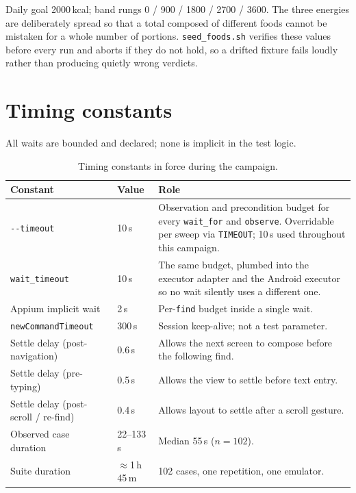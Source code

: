 \documentclass[11pt,a4paper]{article}
\begin{document}
Daily goal 2000\,kcal; band rungs 0 / 900 / 1800 / 2700 / 3600. The three energies
are deliberately spread so that a total composed of different foods cannot be
mistaken for a whole number of portions. \texttt{seed\_foods.sh} verifies these
values before every run and aborts if they do not hold, so a drifted fixture fails
loudly rather than producing quietly wrong verdicts.

\section{Timing constants}

All waits are bounded and declared; none is implicit in the test logic.

\begin{table}[h]
\centering\footnotesize
\caption{Timing constants in force during the campaign.}
\label{tab:timing}
\begin{tabular}{@{}llp{7.8cm}@{}}
\toprule
\textbf{Constant} & \textbf{Value} & \textbf{Role} \\
\midrule
\texttt{-{}-timeout} & 10\,s & Observation and precondition budget for every
\texttt{wait\_for} and \texttt{observe}. Overridable per sweep via
\texttt{TIMEOUT}; 10\,s used throughout this campaign. \\
\texttt{wait\_timeout} & 10\,s & The same budget, plumbed into the executor
adapter and the Android executor so no wait silently uses a different one. \\
Appium implicit wait & 2\,s & Per-\texttt{find} budget inside a single wait. \\
\texttt{newCommandTimeout} & 300\,s & Session keep-alive; not a test parameter. \\
Settle delay (post-navigation) & 0.6\,s & Allows the next screen to compose before
the following find. \\
Settle delay (pre-typing) & 0.5\,s & Allows the view to settle before text entry. \\
Settle delay (post-scroll / re-find) & 0.4\,s & Allows layout to settle after a
scroll gesture. \\
\midrule
Observed case duration & 22--133\,s & Median 55\,s ($n=102$). \\
Suite duration & $\approx$1\,h\,45\,m & 102 cases, one repetition, one emulator. \\
\bottomrule
\end{tabular}
\end{table}
\end{document}
